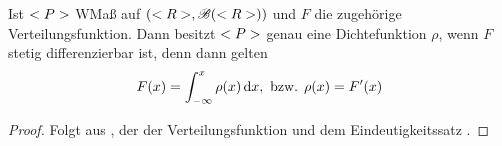 \begin{conclusion}
	Ist $<P>$ WMaß auf $(<R>, \mathscr{B}(<R>))$ und $F$ die zugehörige Verteilungsfunktion. Dann besitzt $<P>$ genau eine Dichtefunktion $\rho$, wenn $F$ stetig differenzierbar ist, denn dann gelten
	\begin{align}
		F(x) = \int_{-\infty}^{x} \rho(x) \,\mathrm{d} x, \text{ bzw. } \rho(x) = F'(x)\notag
	\end{align}
\end{conclusion}

\begin{proof}
	Folgt aus , der  der Verteilungsfunktion und dem Eindeutigkeitssatz .
\end{proof}